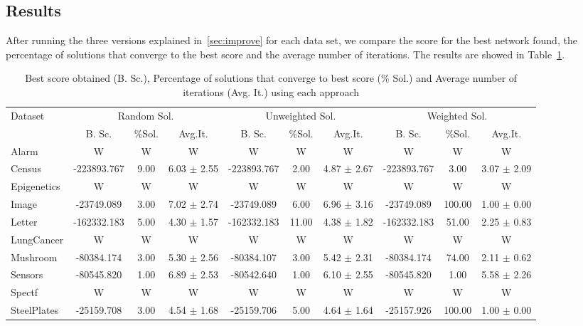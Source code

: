 \subsection{Results}
\label{subsec:results}
	After running the three versions explained in~\ref{sec:improve} for each data set, we compare the score for the best network found, the percentage of solutions that converge to the best score and the average number of iterations. The results are showed in Table~\ref{tab:comparison}.
	
	\begin{table}[ h ]
		\centering
		\begin{tabular}{ | l | c | c | c | c | c | c | c | c | c | }
			\hline
			Dataset & \multicolumn{3}{|c|}{Random Sol.} & \multicolumn{3}{|c|}{Unweighted Sol.} & \multicolumn{3}{|c|}{Weighted Sol.} \\ \cline{2-10}
			& B. Sc. & \%Sol. & Avg.It. & B. Sc. & \%Sol. & Avg.It. & B. Sc. & \%Sol. & Avg.It. \\ \hline
			Alarm & W & W & W & W & W & W & W & W & W \\ \hline
			Census & -223893.767 & 9.00 & 6.03 $\pm$ 2.55 & -223893.767 & 2.00 & 4.87 $\pm$ 2.67 & -223893.767 & 3.00 & 3.07 $\pm$ 2.09 \\ \hline
			Epigenetics & W & W & W & W & W & W & W & W & W \\ \hline
			Image & -23749.089 & 3.00 & 7.02 $\pm$ 2.74 & -23749.089 & 6.00 & 6.96 $\pm$ 3.16 & -23749.089 & 100.00 & 1.00 $\pm$ 0.00 \\ \hline
			Letter & -162332.183 & 5.00 & 4.30 $\pm$ 1.57 & -162332.183 & 11.00 & 4.38 $\pm$ 1.82 & -162332.183 & 51.00 & 2.25 $\pm$ 0.83 \\ \hline
			LungCancer & W & W & W & W & W & W & W & W & W \\ \hline
			Mushroom & -80384.174 & 3.00 & 5.30 $\pm$ 2.56 & -80384.107 & 3.00 & 5.42 $\pm$ 2.31 & -80384.174 & 74.00 & 2.11 $\pm$ 0.62 \\ \hline
			Sensors & -80545.820 & 1.00 & 6.89 $\pm$ 2.53 & -80542.640 & 1.00 & 6.10 $\pm$ 2.55 & -80545.820 & 1.00 & 5.58 $\pm$ 2.26 \\ \hline
			Spectf & W & W & W & W & W & W & W & W & W \\ \hline
			SteelPlates & -25159.708 & 3.00 & 4.54 $\pm$ 1.68 & -25159.706 & 5.00 & 4.64 $\pm$ 1.64 & -25157.926 & 100.00 & 1.00 $\pm$ 0.00 \\ \hline
		\end{tabular}
		\caption{Best score obtained (B. Sc.), Percentage of solutions that converge to best score (\% Sol.) and Average number of iterations (Avg. It.) using each approach}
		\label{tab:comparison}
	\end{table}
	
